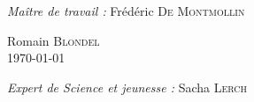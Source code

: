 \begin{titlepage}
\begin{sffamily}
\begin{center}
	\vspace*{\fill}

    \begin{minipage}{0.3\textwidth}
      \begin{flushleft} \large
        \emph{Maître de travail :} Frédéric \textsc{De Montmollin}
      \end{flushleft}
    \end{minipage}
    \begin{minipage}{0.3\textwidth}
      \centering
      Romain \textsc{Blondel}\\
      \today
    \end{minipage}
    \begin{minipage}{0.3\textwidth}
      \begin{flushright} \large
        \emph{Expert de Science et jeunesse :} Sacha \textsc{Lerch}
      \end{flushright}
    \end{minipage}

  \end{center}
  \end{sffamily}
\end{titlepage}